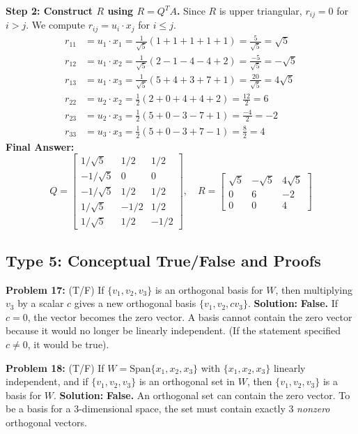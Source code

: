 \documentclass[11pt, letterpaper]{article}
\theoremstyle{definition}
\theoremstyle{remark}
\begin{document}
\textbf{Step 2: Construct $R$ using $R = Q^T A$.}
Since $R$ is upper triangular, $r_{ij} = 0$ for $i > j$. We compute $r_{ij} = u_i \cdot x_j$ for $i \leq j$.
\begin{align*}
    r_{11} &= u_1 \cdot x_1 = \frac{1}{\sqrt{5}}(1 + 1 + 1 + 1 + 1) = \frac{5}{\sqrt{5}} = \sqrt{5} \\
    r_{12} &= u_1 \cdot x_2 = \frac{1}{\sqrt{5}}(2 - 1 - 4 - 4 + 2) = \frac{-5}{\sqrt{5}} = -\sqrt{5} \\
    r_{13} &= u_1 \cdot x_3 = \frac{1}{\sqrt{5}}(5 + 4 + 3 + 7 + 1) = \frac{20}{\sqrt{5}} = 4\sqrt{5} \\
    r_{22} &= u_2 \cdot x_2 = \frac{1}{2}(2 + 0 + 4 + 4 + 2) = \frac{12}{2} = 6 \\
    r_{23} &= u_2 \cdot x_3 = \frac{1}{2}(5 + 0 - 3 - 7 + 1) = \frac{-4}{2} = -2 \\
    r_{33} &= u_3 \cdot x_3 = \frac{1}{2}(5 + 0 - 3 + 7 - 1) = \frac{8}{2} = 4
\end{align*}
\textbf{Final Answer:} 
\[ Q = \begin{bmatrix} 1/\sqrt{5} & 1/2 & 1/2 \\ -1/\sqrt{5} & 0 & 0 \\ -1/\sqrt{5} & 1/2 & 1/2 \\ 1/\sqrt{5} & -1/2 & 1/2 \\ 1/\sqrt{5} & 1/2 & -1/2 \end{bmatrix}, \quad R = \begin{bmatrix} \sqrt{5} & -\sqrt{5} & 4\sqrt{5} \\ 0 & 6 & -2 \\ 0 & 0 & 4 \end{bmatrix} \]

\subsection{Type 5: Conceptual True/False and Proofs}

\textbf{Problem 17:} (T/F) If $\{v_1, v_2, v_3\}$ is an orthogonal basis for $W$, then multiplying $v_3$ by a scalar $c$ gives a new orthogonal basis $\{v_1, v_2, cv_3\}$.
\textbf{Solution:} \textbf{False.} If $c = 0$, the vector becomes the zero vector. A basis cannot contain the zero vector because it would no longer be linearly independent. (If the statement specified $c \neq 0$, it would be true).

\vspace{1em}
\textbf{Problem 18:} (T/F) If $W = \text{Span}\{x_1, x_2, x_3\}$ with $\{x_1, x_2, x_3\}$ linearly independent, and if $\{v_1, v_2, v_3\}$ is an orthogonal set in $W$, then $\{v_1, v_2, v_3\}$ is a basis for $W$.
\textbf{Solution:} \textbf{False.} An orthogonal set can contain the zero vector. To be a basis for a 3-dimensional space, the set must contain exactly 3 \textit{nonzero} orthogonal vectors.
\end{document}

